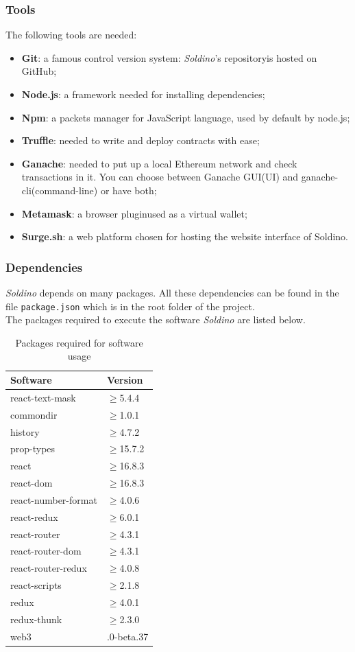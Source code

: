 \subsubsection{Tools}
The following tools are needed:
\begin{itemize}
	\item \textbf{Git}: a famous control version system: \textit{Soldino}'s 
	repository\glosp is hosted on GitHub\glo;
	\item \textbf{Node.js\glo}: a framework needed for installing dependencies;
	\item \textbf{Npm\glo}: a packets manager for JavaScript language, used by default by node.js;
	\item \textbf{Truffle\glo}: needed to write and deploy contracts with ease;
	\item \textbf{Ganache\glo}: needed to put up a local Ethereum network and check 
	transactions in it. You can choose between Ganache GUI(UI) and ganache-cli(command-line) or have both;
	\item \textbf{Metamask\glo}: a browser plugin\glosp used as a virtual wallet;
	\item \textbf{Surge.sh\glo}: a web platform chosen for hosting the website 
	interface of Soldino.
\end{itemize}

\subsubsection{Dependencies}
\textit{Soldino} depends on many packages. All these dependencies can be found 
in the file \texttt{package.json} which is in the root folder of the project.\\
The packages required to execute the software \textit{Soldino} are listed below.\\

\renewcommand{\arraystretch}{1.5}
\begin{longtable}{ 
		>{\centering}p{} 
		>{\centering}p{}
	}
	\caption{Packages required for software usage}\\
	\rowcolorhead
	\textbf{\color{white}Software} & 
	\textbf{\color{white}Version}
	\tabularnewline  
	\endhead	
	


	react-text-mask & $\geq$5.4.4
	\tabularnewline
	commondir &$\geq$1.0.1
	\tabularnewline
	history &$\geq$4.7.2
	\tabularnewline
	prop-types &$\geq$15.7.2\tabularnewline
	react &$\geq$16.8.3\tabularnewline
	react-dom &$\geq$16.8.3\tabularnewline
	react-number-format &$\geq$4.0.6\tabularnewline
	react-redux &$\geq$6.0.1\tabularnewline
	react-router &$\geq$4.3.1\tabularnewline
	react-router-dom &$\geq$4.3.1\tabularnewline
	react-router-redux &$\geq$4.0.8\tabularnewline
	react-scripts &$\geq$2.1.8\tabularnewline
	redux &$\geq$4.0.1\tabularnewline
	redux-thunk &$\geq$2.3.0\tabularnewline
	web3 & 1.0.0-beta.37\tabularnewline
	
\end{longtable}


